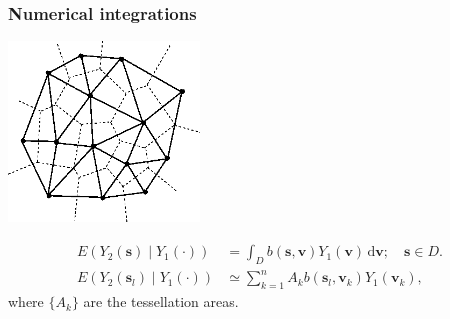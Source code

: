 \documentclass{beamer}
\newcommand{\svec} {\textbf{s}}
\newcommand{\s}{\mathbf{s}}
\renewcommand{\v}{\mathbf{v}}
\renewcommand{\d}{\mathrm{d}}
\newcommand{\E}{E}
\begin{document}


\begin{frame}
\frametitle{Numerical integrations}

\vspace{-1cm}

\begin{center}
\includegraphics[width=2in]{vor3.png}
\end{center}

\vspace{-1.5cm}

\begin{align*}
\E\left(Y_2(\s)\mid Y_1(\cdot)\right)&=\int_D{b(\s,\v)Y_1(\v)\,\d \v};\quad \s\in D.\\
\E(Y_2(\svec_l) \mid  Y_1(\cdot)) &\simeq \sum_{k=1}^{n} A_k b(\svec_l,\v_k)Y_1(\v_k),
\end{align*}
where $\{A_k\}$ are the tessellation areas.
\end{frame}

\end{document}
